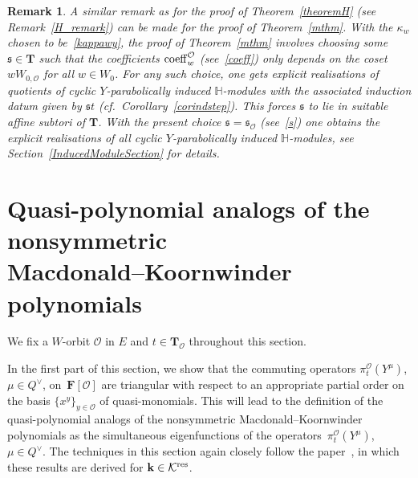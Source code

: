 \documentclass[pdftex]{sigma}
\numberwithin{equation}{section}
\newtheorem{Remark}[Theorem]{Remark} }
\begin{document}
\begin{Remark}%
A similar remark as for the proof of Theorem~\ref{theoremH} (see Remark~\ref{H_remark}) can be made for the proof of Theorem~\ref{mthm}. With the $\kappa_w$ chosen to be~\eqref{kappawy},
the proof of Theorem~\ref{mthm} involves choosing some $\mathfrak{s}\in\mathbf{T}$ such that the coefficients ${\rm coeff}_w^\mathcal{O}$ (see~\eqref{coeff}) only depends on the coset $wW_{0,\mathcal{O}}$ for all $w\in W_0$.
For any such choice, one gets explicit realisations of quotients of cyclic $Y$-parabolically induced $\mathbb{H}$-modules with the associated induction datum given by $\mathfrak{s}t$ (cf.~Corollary~\ref{corindstep}). This forces $\mathfrak{s}$ to lie in suitable affine subtori of $\mathbf{T}$.
With the present choice $\mathfrak{s}=\mathfrak{s}_\mathcal{O}$ (see~\eqref{s}) one obtains the explicit realisations of all cyclic $Y$-parabolically induced $\mathbb{H}$-modules,
see Section~\ref{InducedModuleSection} for details.
\end{Remark}

\section[Quasi-polynomial analogs of the nonsymmetric Macdonald--Koornwinder polynomials]{Quasi-polynomial analogs of the nonsymmetric\\ Macdonald--Koornwinder polynomials}\label{qKsection}

We fix a $W$-orbit $\mathcal{O}$ in $E$ and $t\in\mathbf{T}_{\mathcal{O}}$ throughout this section.

In the first part of this section, we show that the commuting operators $\pi_{t}^\mathcal{O}(Y^\mu)$, $\mu\in Q^\vee$, on~$\mathbf{F}[\mathcal{O}]$ are triangular with respect to an appropriate partial order on the basis $\{x^y\}_{y\in\mathcal{O}}$ of quasi-monomials. This will lead to the definition of the quasi-polynomial analogs of the nonsymmetric Macdonald--Koorn\-win\-der polynomials as the simultaneous eigenfunctions of the operators~$\pi_{t}^\mathcal{O}(Y^\mu)$, $\mu\in Q^\vee$. The techniques in this section again closely follow the paper~\cite{SSV2}, in which these results are derived for $\mathbf{k}\in\mathcal{K}^{{\rm res}}$.
\end{document}
